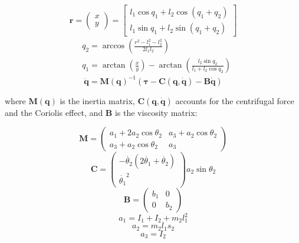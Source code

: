 \begin{equation}
\bm{r} =\left(\begin{matrix} x\\y \end{matrix}\right) %
= \left[ \begin{matrix}  l_1\cos{q_1} + l_2\cos{(q_1+q_2)} \\ l_1\sin{q_1} + l_2\sin{(q_1+q_2)}  \end{matrix} \right]
\end{equation}
\begin{equation}
\begin{split}
& q_2 = \arccos{\left(\frac{r^2-l_1^2-l_2^2}{2l_1l_2}\right)} \\
& q_1 = \arctan{\left( \frac{x}{y} \right)} - \arctan{\left(\frac{l_2\sin{q_2}}{l_1+l_2\cos q_2 }\right)}
\end{split}
\end{equation}
\begin{equation} \label{dynamics}
\ddot{\bm{q}} = \bm{M}(\bm{q})^{-1} (\bm{\tau} - \bm{C}(\bm{q}, \dot{\bm{q}}) - \bm{B}\dot{\bm{q}})
\end{equation}

where $\bm{M}(\bm{q})$ is the inertia matrix, $\bm{C}(\bm{q}, \dot{\bm{q}})$ accounts for the centrifugal force and the Coriolis effect, and $\bm{B}$ is the viscosity matrix:

\begin{equation}
\bm{M} = \left( \begin{matrix} a_1 + 2a_2\cos\theta_2  &  a_3 + a_2 \cos\theta_2 \\
a_3 + a_2 \cos\theta_2   &  a_3
\end{matrix}\right)
\end{equation}
\begin{equation}
\bm{C} = \left( \begin{matrix} -\dot{\theta_2}(2\dot{\theta_1}+\dot{\theta_2}) \\
\dot{\theta_1}^2	\end{matrix} \right)
a_2\sin{\theta_2}
\end{equation}
\begin{equation}
\bm{B} = \left( \begin{matrix} b_1  & 0 \\ 0 & b_2 \end{matrix} \right)
\end{equation}
\begin{equation}
a_1 = I_1 + I_2 + m_2 l_1^2
\end{equation}
\begin{equation}
a_2 = m_2 l_1 s_2
\end{equation}
\begin{equation}
a_3 = I_2
\end{equation}

